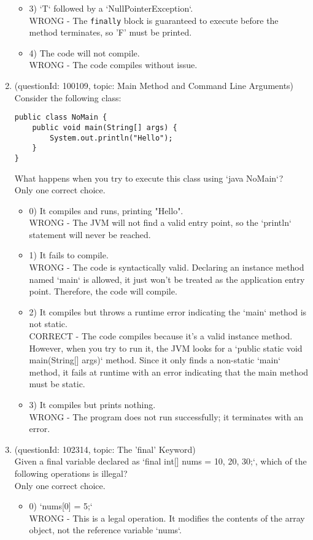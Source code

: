 \documentclass[12pt]{article}
\begin{document}
\begin{enumerate}[label=(\arabic*)]
\begin{itemize}
\item 3) `T` followed by a `NullPointerException`.
 \\ 
WRONG - The \verb|finally| block is guaranteed to execute before the method terminates, so 'F' must be printed.

\item 4) The code will not compile.
 \\ 
WRONG - The code compiles without issue.

\end{itemize}
\item (questionId: 100109, topic: Main Method and Command Line Arguments) \\ 
Consider the following class:
\begin{verbatim}
public class NoMain {
    public void main(String[] args) {
        System.out.println("Hello");
    }
}
\end{verbatim}
What happens when you try to execute this class using `java NoMain`?
\\ \noindent Only one correct choice. 
\begin{itemize}
\item 0) It compiles and runs, printing "Hello".
 \\ 
WRONG - The JVM will not find a valid entry point, so the `println` statement will never be reached.

\item 1) It fails to compile.
 \\ 
WRONG - The code is syntactically valid. Declaring an instance method named `main` is allowed, it just won't be treated as the application entry point. Therefore, the code will compile.

\item 2) It compiles but throws a runtime error indicating the `main` method is not static.
 \\ 
CORRECT - The code compiles because it's a valid instance method. However, when you try to run it, the JVM looks for a `public static void main(String[] args)` method. Since it only finds a non-static `main` method, it fails at runtime with an error indicating that the main method must be static.

\item 3) It compiles but prints nothing.
 \\ 
WRONG - The program does not run successfully; it terminates with an error.

\end{itemize}
\item (questionId: 102314, topic: The 'final' Keyword) \\ 
Given a final variable declared as `final int[] nums = {10, 20, 30};`, which of the following operations is illegal?
\\ \noindent Only one correct choice. 
\begin{itemize}
\item 0) `nums[0] = 5;`
 \\ 
WRONG - This is a legal operation. It modifies the contents of the array object, not the reference variable `nums`.


\end{itemize}
\end{enumerate}
\end{document}
